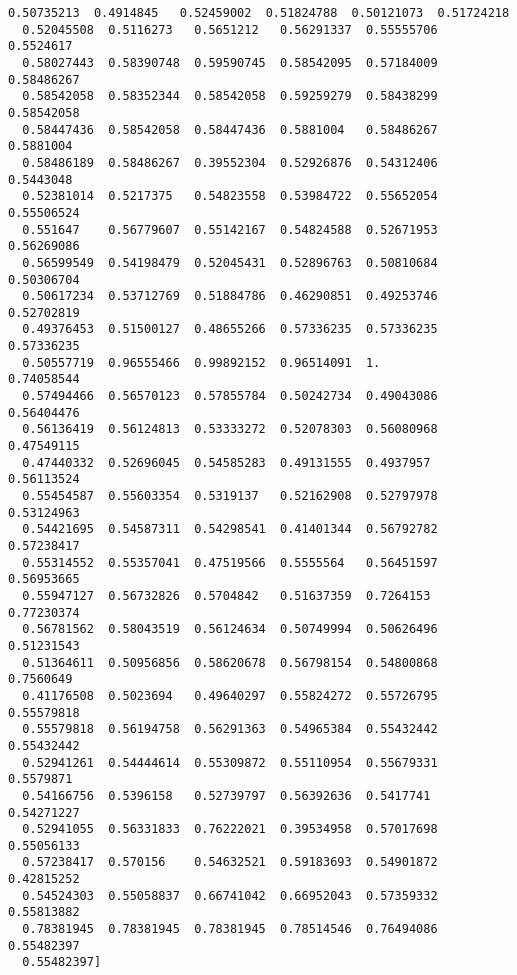 \documentclass[11pt]{article}
\begin{document}
\begin{Verbatim}[commandchars=\\\{\}]
  0.50735213  0.4914845   0.52459002  0.51824788  0.50121073  0.51724218
  0.52045508  0.5116273   0.5651212   0.56291337  0.55555706  0.5524617
  0.58027443  0.58390748  0.59590745  0.58542095  0.57184009  0.58486267
  0.58542058  0.58352344  0.58542058  0.59259279  0.58438299  0.58542058
  0.58447436  0.58542058  0.58447436  0.5881004   0.58486267  0.5881004
  0.58486189  0.58486267  0.39552304  0.52926876  0.54312406  0.5443048
  0.52381014  0.5217375   0.54823558  0.53984722  0.55652054  0.55506524
  0.551647    0.56779607  0.55142167  0.54824588  0.52671953  0.56269086
  0.56599549  0.54198479  0.52045431  0.52896763  0.50810684  0.50306704
  0.50617234  0.53712769  0.51884786  0.46290851  0.49253746  0.52702819
  0.49376453  0.51500127  0.48655266  0.57336235  0.57336235  0.57336235
  0.50557719  0.96555466  0.99892152  0.96514091  1.          0.74058544
  0.57494466  0.56570123  0.57855784  0.50242734  0.49043086  0.56404476
  0.56136419  0.56124813  0.53333272  0.52078303  0.56080968  0.47549115
  0.47440332  0.52696045  0.54585283  0.49131555  0.4937957   0.56113524
  0.55454587  0.55603354  0.5319137   0.52162908  0.52797978  0.53124963
  0.54421695  0.54587311  0.54298541  0.41401344  0.56792782  0.57238417
  0.55314552  0.55357041  0.47519566  0.5555564   0.56451597  0.56953665
  0.55947127  0.56732826  0.5704842   0.51637359  0.7264153   0.77230374
  0.56781562  0.58043519  0.56124634  0.50749994  0.50626496  0.51231543
  0.51364611  0.50956856  0.58620678  0.56798154  0.54800868  0.7560649
  0.41176508  0.5023694   0.49640297  0.55824272  0.55726795  0.55579818
  0.55579818  0.56194758  0.56291363  0.54965384  0.55432442  0.55432442
  0.52941261  0.54444614  0.55309872  0.55110954  0.55679331  0.5579871
  0.54166756  0.5396158   0.52739797  0.56392636  0.5417741   0.54271227
  0.52941055  0.56331833  0.76222021  0.39534958  0.57017698  0.55056133
  0.57238417  0.570156    0.54632521  0.59183693  0.54901872  0.42815252
  0.54524303  0.55058837  0.66741042  0.66952043  0.57359332  0.55813882
  0.78381945  0.78381945  0.78381945  0.78514546  0.76494086  0.55482397
  0.55482397]

\end{Verbatim}
\end{document}
